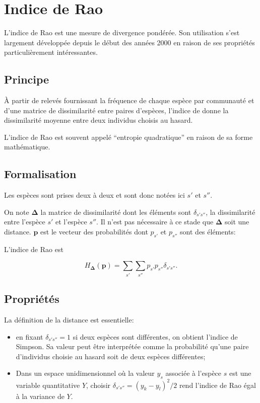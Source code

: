 \documentclass[
  11pt,
  french,
  a4paper,
  extrafontsizes,onecolumn,openright
  ]{memoir}
\providecommand{\tightlist}{%
  \setlength{\itemsep}{0pt}\setlength{\parskip}{0pt}}
\begin{document}
\section{Indice de Rao}\label{sec-Rao}

L'indice de Rao est une mesure de divergence pondérée. Son utilisation s'est largement développée depuis le début des années 2000 \autocite{Izsak2000,Shimatani2001a,Botta-Dukat2005,Escalas2013} en raison de ses propriétés particulièrement intéressantes.

\subsection{Principe}\label{principe}

À partir de relevés fournissant la fréquence de chaque espèce par communauté et d'une matrice de dissimilarité entre paires d'espèces, l'indice de \textcite{Rao1982} donne la dissimilarité moyenne entre deux individus choisis au hasard.

L'indice de Rao est souvent appelé ``entropie quadratique'' en raison de sa forme mathématique.

\subsection{Formalisation}\label{formalisation}

Les espèces sont prises deux à deux et sont donc notées ici \(s'\) et \(s''\).

On note \(\mathbf{\Delta}\) la matrice de dissimilarité dont les éléments sont \(\delta_{s's''}\), la dissimilarité entre l'espèce \(s'\) et l'espèce \(s''\).
Il n'est pas nécessaire à ce stade que \(\mathbf{\Delta}\) soit une distance.
\(\mathbf{p}\) est le vecteur des probabilités dont \(p_{s'}\) et \(p_{s''}\) sont des éléments:

L'indice de Rao est

\begin{equation}
  \label{eq:Rao}
  H_{\mathbf{\Delta}}\left(\mathbf{p}\right)=\sum_{s'}{\sum_{s''}{p_{s'}}}p_{s''}\delta_{s's''}.
\end{equation}

\subsection{Propriétés}\label{propriuxe9tuxe9s}

La définition de la distance est essentielle:

\begin{itemize}
\tightlist
\item
  en fixant \(\delta_{s's''}=1\) si deux espèces sont différentes, on obtient l'indice de Simpson.
  Sa valeur peut être interprétée comme la probabilité qu'une paire d'individus choisie au hasard soit de deux espèces différentes;
\item
  Dans un espace unidimensionnel où la valeur \(y_s\) associée à l'espèce \(s\) est une variable quantitative \(Y\), choisir \(\delta_{s's''}={{\left(y_k-y_l\right)}^2}/{2}\) rend l'indice de Rao égal à la variance de \(Y\).
\end{itemize}
\end{document}
